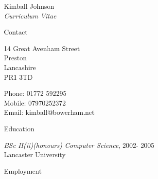 \documentclass[10pt]{article}
\begin{document}
\newlength{\oldcvlabelwidth}
\renewcommand*{\cvbibname}{}

\begin{cv}{Kimball Johnson\\{\large \itshape Curriculum Vitae}}

\begin{cvlist}{Contact}
	\item 14 Great Avenham Street\\
	Preston\\
	Lancashire\\
	PR1 3TD
	\item Phone: 01772 592295\\
	Mobile: 07970252372\\
	Email: kimball@bowerham.net
\end{cvlist}
\begin{cvlist}{Education}
	\item \emph{BSc II(ii)(honours) Computer Science}, 2002- 2005\\
	Lancaster University
\end{cvlist}
\begin{cvlist}{Employment}


\end{cvlist}
\end{cv}
\end{document}
